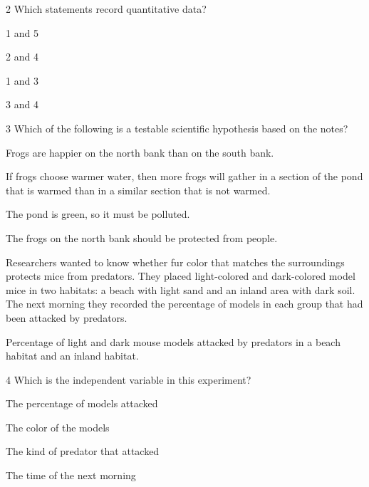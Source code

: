 \documentclass[11pt,letterpaper]{article}
\begin{document}
\begin{mcq}{2}
Which statements record quantitative data?
\begin{choices}
  \item 1 and 5
  \item 2 and 4
  \item 1 and 3
  \item 3 and 4
\end{choices}
\end{mcq}

\begin{mcq}{3}
Which of the following is a testable scientific hypothesis based on the notes?
\begin{choices}
  \item Frogs are happier on the north bank than on the south bank.
  \item If frogs choose warmer water, then more frogs will gather in a section of the pond that is warmed than in a similar section that is not warmed.
  \item The pond is green, so it must be polluted.
  \item The frogs on the north bank should be protected from people.
\end{choices}
\end{mcq}


Researchers wanted to know whether fur color that matches the surroundings protects mice from predators. They placed light-colored and dark-colored model mice in two habitats: a beach with light sand and an inland area with dark soil. The next morning they recorded the percentage of models in each group that had been attacked by predators.

  {Percentage of light and dark mouse models attacked by predators in a beach habitat and an inland habitat.}

\begin{mcq}{4}
Which is the independent variable in this experiment?
\begin{choices}
  \item The percentage of models attacked
  \item The color of the models
  \item The kind of predator that attacked
  \item The time of the next morning
\end{choices}
\end{mcq}
\end{document}
